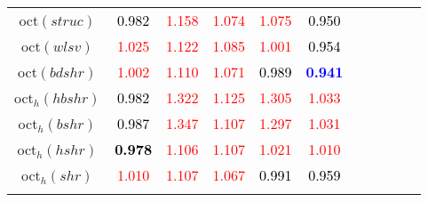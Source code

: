 \begin{tabular}[t]{c|>{}cccc>{}c|ccccc}
oct$(struc)$ & \textcolor{black}{0.982} & \textcolor{red}{1.158} & \textcolor{red}{1.074} & \textcolor{red}{1.075} & \textcolor{black}{0.950} &  &  &  &  & \\
oct$(wlsv)$ & \textcolor{red}{1.025} & \textcolor{red}{1.122} & \textcolor{red}{1.085} & \textcolor{red}{1.001} & \textcolor{black}{0.954} &  &  &  &  & \\
oct$(bdshr)$ & \textcolor{red}{1.002} & \textcolor{red}{1.110} & \textcolor{red}{1.071} & \textcolor{black}{0.989} & \textcolor{blue}{\textbf{0.941}} &  &  &  &  & \\
oct$_h(hbshr)$ & \textcolor{black}{0.982} & \textcolor{red}{1.322} & \textcolor{red}{1.125} & \textcolor{red}{1.305} & \textcolor{red}{1.033} &  &  &  &  & \\
oct$_h(bshr)$ & \textcolor{black}{0.987} & \textcolor{red}{1.347} & \textcolor{red}{1.107} & \textcolor{red}{1.297} & \textcolor{red}{1.031} &  &  &  &  & \\
oct$_h(hshr)$ & \textcolor{black}{\textbf{0.978}} & \textcolor{red}{1.106} & \textcolor{red}{1.107} & \textcolor{red}{1.021} & \textcolor{red}{1.010} &  &  &  &  & \\
oct$_h(shr)$ & \textcolor{red}{1.010} & \textcolor{red}{1.107} & \textcolor{red}{1.067} & \textcolor{black}{0.991} & \textcolor{black}{0.959} &  &  &  &  & \\
\bottomrule
{}\\
\end{tabular}
